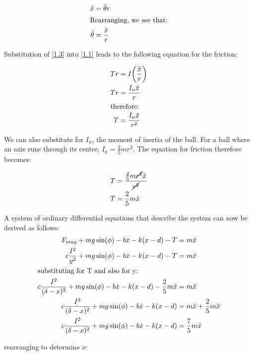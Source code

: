 \documentclass[a4paper,10pt,reqno]{amsart}
\numberwithin{equation}{section}
\begin{document}
\begin{align}
\ddot{x} &= \ddot{\theta}r \label{1.2} \\
\intertext{Rearranging, we see that:}
\ddot{\theta} &= \frac{\ddot{x}}{r} \label{1.3}
\end{align}

\newline Substitution of \ref{1.3} into \ref{1.1} leads to the following equation for the friction:

\begin{align}
Tr &= I\bigg(\frac{\ddot{x}}{r}\bigg)\nonumber\\ 
Tr &= \frac{I_n\ddot{x}}{r} \nonumber \\ 
\intertext{therefore:}
T &= \frac{I_n\ddot{x}}{r^2} \label{1.4}
\end{align}

\newline We can also substitute for $I_n$, the moment of inertia of the ball. 
\newline For a ball where an axis runs through its centre, $I_n = \frac{2}{5}mr^2$.
\newline The equation for friction therefore becomes:

\begin{align}
T &= \frac{\frac{2}{5}m\cancel{r^2}\ddot{x}}{\cancel{r^2}} \nonumber \\
T &= \frac{2}{5}m\ddot{x} \label{1.5}
\end{align}
\vspace{3mm}

\newline A system of ordinary differential equations that describe the system can now be derived as follows:
\begin{align}
F_{mag} + mg\sin(\phi) - b\dot{x} - k(x - d) - T &= m\ddot{x} \nonumber \\
c \frac{I^2}{y^2} + mg\sin(\phi) - b\dot{x} - k(x - d) - T &= m\ddot{x} \nonumber \\
\intertext{substituting for T and also for y:}
c \frac{I^2}{(\delta - x)^2} + mg\sin(\phi) - b\dot{x} - k(x - d) - \frac{2}{5}m\ddot{x} &= m\ddot{x} \nonumber \\
c \frac{I^2}{(\delta - x)^2} + mg\sin(\phi) - b\dot{x} - k(x - d) &= m\ddot{x} + \frac{2}{5}m\ddot{x}\nonumber \\
c \frac{I^2}{(\delta - x)^2} + mg\sin(\phi) - b\dot{x} - k(x - d) &= \frac{7}{5}m\ddot{x}\nonumber
\end{align}

rearranging to determine $\ddot{x}$:
\end{document}
